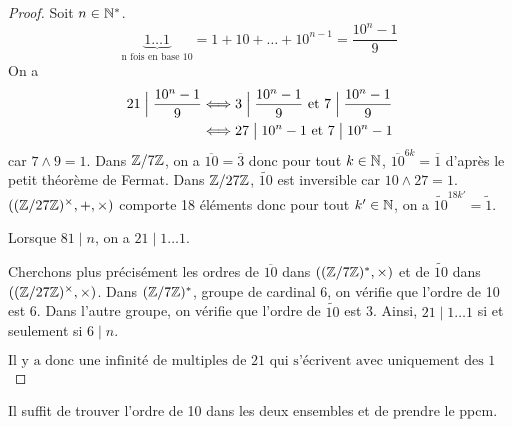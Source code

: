 \begin{proof}
	Soit $n\in\mathbb{N}^{*}$.
	\begin{equation}
		\underbrace{1\dots 1}_{\text{n fois en base 10}}=1+10+\dots+10^{n-1}=\frac{10^{n}-1}{9}
	\end{equation}
	On a 
	\begin{align}
		21\Bigm|\frac{10^{n}-1}{9}
		&\Longleftrightarrow 3\Bigm|\frac{10^{n}-1}{9}\text{ et }7\Bigm|\frac{10^{n}-1}{9}\\
		&\Longleftrightarrow 27\bigm|10^{n}-1\text{ et }7\bigm| 10^{n}-1
	\end{align}
	car $7\wedge 9=1$.
	Dans $\mathbb{Z}/7\mathbb{Z}$, on a $\overline{10}=\overline{3}$ donc pour tout $k\in\mathbb{N}$, $\overline{10}^{6k}=\overline{1}$ d'après le petit théorème de Fermat. Dans $\mathbb{Z}/27\mathbb{Z}$, $\widetilde{10}$ est inversible car $10\wedge 27=1$. $\left((\mathbb{Z}/27\mathbb{Z})^{\times},+,\times\right)$ comporte 18 éléments donc pour tout $k'\in\mathbb{N}$, on a $\widetilde{10}^{18k'}=\widetilde{1}$.

	Lorsque $81\mid n$, on a $21\mid 1\dots 1$. 
	
	Cherchons plus précisément les ordres de $\overline{10}$ dans $((\mathbb{Z}/7\mathbb{Z})^{*},\times)$ et de $\widetilde{10}$ dans $((\mathbb{Z}/27\mathbb{Z})^{\times},\times)$.
	Dans $(\mathbb{Z}/7\mathbb{Z})^{*}$, groupe de cardinal 6, on vérifie que l'ordre de 10 est 6. Dans l'autre groupe, on vérifie que l'ordre de $\widetilde{10}$ est 3. Ainsi, $21\mid 1\dots 1$ si et seulement si $6\mid n$.

	\begin{equation}
		\boxed{\text{Il y a donc une infinité de multiples de 21 qui s'écrivent avec uniquement des 1 en base 10.}}
	\end{equation}
\end{proof}

\begin{remark}
	Il suffit de trouver l'ordre de 10 dans les deux ensembles et de prendre le ppcm.
\end{remark}

